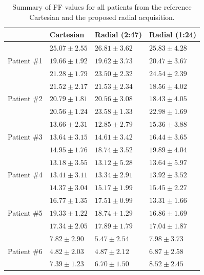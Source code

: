 \documentclass[journal,twoside,web]{ieeecolor}
\begin{document}
\begin{table}[h!]
	\caption{Summary of FF values for all patients from the reference Cartesian and the proposed radial acquisition.}
	\label{TAB:SubjectSTAT_FF}
	\setlength{\tabcolsep}{3pt}
	\begin{tabular}{m{} m{} m{} m{}}
		\toprule
		& Cartesian & Radial (2:47) & Radial (1:24) \\
		\hline
		\multirow[t]{3}{*}{Patient \#1}   
		& $25.07 \pm 2.55$ & $26.81 \pm 3.62$ & $ 25.83 \pm 4.28$ \\ %
		& $19.66 \pm 1.92$ & $19.62 \pm 3.73$ & $ 20.47 \pm 3.67$ \\
		& $21.28 \pm 1.79$ & $23.50 \pm 2.32$ & $ 24.54 \pm 2.39$ \\
		\hline
		\multirow[t]{3}{*}{Patient \#2}   
		& $21.52 \pm 2.17$ & $21.53 \pm 2.34$ & $ 18.56 \pm 4.02 $ \\ %
		& $20.79 \pm 1.81$ & $20.56 \pm 3.08$ & $ 18.43 \pm 4.05 $ \\
		& $20.56 \pm 1.24$ & $23.58 \pm 1.33$ & $ 22.98 \pm 1.69 $ \\
		\hline
		\multirow[t]{3}{*}{Patient \#3}   
		& $13.66 \pm 2.31$ & $12.85 \pm 2.79$ & $15.36 \pm 3.88$ \\ %
		& $13.64 \pm 3.15$ & $14.61 \pm 3.42$ & $16.44 \pm 3.65$ \\
		& $14.95 \pm 1.76$ & $18.74 \pm 3.52$ & $19.89 \pm 4.04$ \\
		\hline
		\multirow[t]{3}{*}{Patient \#4}   
		& $13.18 \pm 3.55$ & $13.12 \pm 5.28$ & $13.64 \pm 5.97$ \\ %
		& $13.41 \pm 3.11$ & $13.34 \pm 2.91$ & $13.92 \pm 3.52$ \\
		& $14.37 \pm 3.04$ & $15.17 \pm 1.99$ & $15.45 \pm 2.27$ \\
		\hline
		\multirow[t]{3}{*}{Patient \#5}   
		& $16.77 \pm 1.35$ & $17.51 \pm 0.99$ & $13.31 \pm 1.66$ \\ %
		& $19.33 \pm 1.22$ & $18.74 \pm 1.29$ & $16.86 \pm 1.69$ \\
		& $17.34 \pm 2.05$ & $17.89 \pm 1.79$ & $17.04 \pm 1.87$ \\
		\hline
		\multirow[t]{3}{*}{Patient \#6}   
		& $ 7.82 \pm 2.90$ & $ 5.47 \pm 2.54$ & $7.98 \pm 3.73$ \\ %
		& $ 4.82 \pm 2.03$ & $ 4.87 \pm 2.12$ & $6.87 \pm 2.58$ \\
		& $ 7.39 \pm 1.23$ & $ 6.70 \pm 1.50$ & $8.52 \pm 2.45$ \\

\end{tabular}
\end{table}
\end{document}
